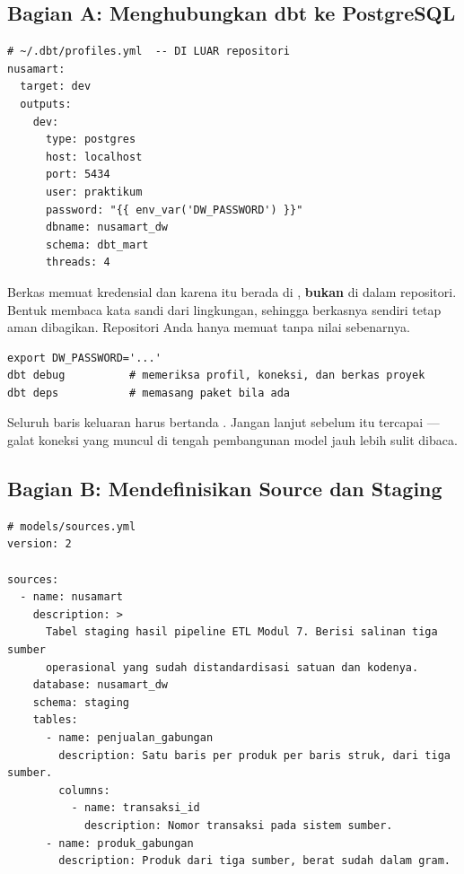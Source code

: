 \subsection{Bagian A: Menghubungkan dbt ke PostgreSQL}


\begin{lstlisting}[style=yamlgaya]
# ~/.dbt/profiles.yml  -- DI LUAR repositori
nusamart:
  target: dev
  outputs:
    dev:
      type: postgres
      host: localhost
      port: 5434
      user: praktikum
      password: "{{ env_var('DW_PASSWORD') }}"
      dbname: nusamart_dw
      schema: dbt_mart
      threads: 4
\end{lstlisting}

\begin{peringatan}
Berkas  memuat kredensial dan karena itu berada di
, \textbf{bukan} di dalam repositori. Bentuk
 membaca kata sandi dari lingkungan, sehingga berkasnya
sendiri tetap aman dibagikan. Repositori Anda hanya memuat
 tanpa nilai sebenarnya.
\end{peringatan}


\begin{lstlisting}[style=shellgaya]
export DW_PASSWORD='...'
dbt debug          # memeriksa profil, koneksi, dan berkas proyek
dbt deps           # memasang paket bila ada
\end{lstlisting}

Seluruh baris keluaran  harus bertanda .
Jangan lanjut sebelum itu tercapai --- galat koneksi yang muncul di tengah
pembangunan model jauh lebih sulit dibaca.

\subsection{Bagian B: Mendefinisikan Source dan Staging}


\begin{lstlisting}[style=yamlgaya]
# models/sources.yml
version: 2

sources:
  - name: nusamart
    description: >
      Tabel staging hasil pipeline ETL Modul 7. Berisi salinan tiga sumber
      operasional yang sudah distandardisasi satuan dan kodenya.
    database: nusamart_dw
    schema: staging
    tables:
      - name: penjualan_gabungan
        description: Satu baris per produk per baris struk, dari tiga sumber.
        columns:
          - name: transaksi_id
            description: Nomor transaksi pada sistem sumber.
      - name: produk_gabungan
        description: Produk dari tiga sumber, berat sudah dalam gram.
\end{lstlisting}


